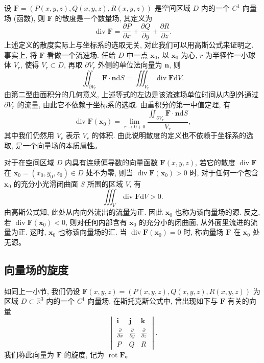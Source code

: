 \documentclass[UTF8,12pt,a4paper,fontset=fandol]{ctexart}
\begin{document}
设 $\boldsymbol F=(P(x,y,z),Q(x,y,z),R(x,y,z))$ 是空间区域 $D$ 内的一个 $C^1$ 向量场 (函数), 则 $\boldsymbol F$ 的散度是一个数量场, 其定义为
\[
  \operatorname{div}\boldsymbol F=
  \frac{\partial P}{\partial x}+\frac{\partial Q}{\partial y}+\frac{\partial R}{\partial z}.
\]
上述定义的散度实际上与坐标系的选取无关, 对此我们可以用高斯公式来证明之. 事实上, 将 $\boldsymbol F$ 看做一个流速场. 任给 $D$ 中一点 $\boldsymbol x_0$, 以 $\boldsymbol x_0$ 为心, $r$ 为半径作一小球体 $V_r$, 使得 $V_r\subset D$, 再取 $\partial V_r$ 外侧的单位法向量为 $\boldsymbol n$, 则
\[
  \iint_{\partial V_r}\boldsymbol F\cdot\boldsymbol n\mathrm dS
  =
  \iiint_{V_r}\operatorname{div}\boldsymbol F\mathrm dV.
\]
由第二型曲面积分的几何意义, 上述等式的左边是该流速场单位时间从内到外通过 $\partial V_r$ 的流量, 由此它不依赖于坐标系的选取. 由重积分的第一中值定理, 有
\[
  \operatorname{div}\boldsymbol F(\boldsymbol x_0)
  =
  \lim_{r\to0+0}
  \frac{\iint_{\partial V_r}\boldsymbol F\cdot\boldsymbol n\mathrm dS}{V_r},
\]
其中我们仍然用 $V_r$ 表示 $V_r$ 的体积. 由此说明散度的定义也不依赖于坐标系的选取, 是一个向量场的本质属性。

对于在空间区域 $D$ 内具有连续偏导数的向量函数 $\boldsymbol F(x,y,z)$, 若它的散度 $\operatorname{div}\boldsymbol F$ 在 $\boldsymbol x_0=(x_0,y_0,z_0)\in D$ 处不为零, 则当 $\operatorname{div}\boldsymbol F(\boldsymbol x_0)>0$ 时, 对于任何一个包含 $\boldsymbol x_0$ 的充分小光滑闭曲面 $S$ 所围的区域 $V$, 有
\[
  \iiint_V\operatorname{div}\boldsymbol F\mathrm dV>0.
\]
由高斯公式知, 此处从内向外流出的流量为正. 因此 $\boldsymbol x_0$ 也称为该向量场的源. 反之, 若 $\operatorname{div}\boldsymbol F(\boldsymbol x_0)<0$, 则对任何内部含有 $\boldsymbol x_0$ 的充分小的闭曲面, 从外面里流进的流量为正. 这时, $\boldsymbol x_0$ 也称该向量场的汇. 当 $\operatorname{div}\boldsymbol F(\boldsymbol x_0)=0$ 时, 称向量场 $\boldsymbol F$ 在 $\boldsymbol x_0$ 处无源。

\subsection{向量场的旋度}

如同上一小节, 我们仍设 $\boldsymbol F(x,y,z)=(P(x,y,z),Q(x,y,z),R(x,y,z))$ 为区域 $D\subset\mathbb R^3$ 内的一个 $C^1$ 向量场. 在斯托克斯公式中, 曾出现如下与 $\boldsymbol F$ 有关的向量
\[
  \begin{vmatrix}
    \boldsymbol i&\boldsymbol j&\boldsymbol k\\
    \frac{\partial}{\partial x}&\frac{\partial}{\partial y}&\frac{\partial}{\partial z}\\
    P&Q&R
  \end{vmatrix}.
\]
我们称此向量为 $\boldsymbol F$ 的旋度, 记为 $\operatorname{rot}\boldsymbol F$。
\end{document}
